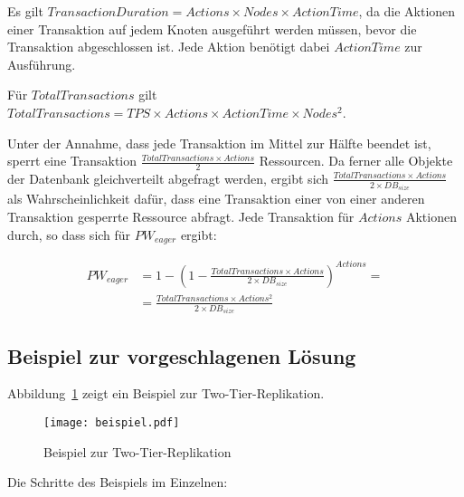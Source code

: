 \documentclass[11pt,a4paper]{scrartcl}
\begin{document}
Es gilt $TransactionDuration = Actions \times Nodes \times ActionTime$, da die
Aktionen einer Transaktion auf jedem Knoten ausgeführt werden müssen, bevor die
Transaktion abgeschlossen ist.  Jede Aktion benötigt dabei $ActionTime$ zur
Ausführung.

Für $TotalTransactions$ gilt $TotalTransactions = TPS \times Actions \times
ActionTime \times Nodes^2$.

Unter der Annahme, dass jede Transaktion im Mittel zur Hälfte beendet ist,
sperrt eine Transaktion $\frac{TotalTransactions \times Actions}{2}$
Ressourcen.  Da ferner alle Objekte der Datenbank gleichverteilt abgefragt
werden, ergibt sich $\frac{TotalTransactions\times Actions}{2 \times
  DB_{size}}$ als Wahrscheinlichkeit dafür, dass eine Transaktion einer von
einer anderen Transaktion gesperrte Ressource abfragt.  Jede Transaktion für
$Actions$ Aktionen durch, so dass sich für $PW_{eager}$ ergibt:

\begin{align*}
  PW_{eager} &= 1-\left(1 - \frac{TotalTransactions\times Actions}{2
      \times DB_{size}}\right)^{Actions} = \\
  &= \frac{TotalTransactions \times Actions^2}{2 \times DB_{size}}
\end{align*}

\subsection{Beispiel zur vorgeschlagenen Lösung}

Abbildung~\ref{fig:two_tier_example} zeigt ein Beispiel zur
Two-Tier-Replikation.

\begin{figure}[h]
  \centering
  \texttt{[image: beispiel.pdf]}
  \caption{Beispiel zur Two-Tier-Replikation}
  \label{fig:two_tier_example}
\end{figure}

Die Schritte des Beispiels im Einzelnen:
\end{document}
